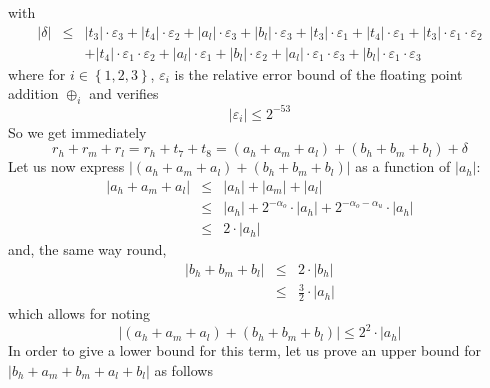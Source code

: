 \documentclass[a4paper,10pt,twoside]{article}
\newenvironment{proof}[1][Proof]{\begin{trivlist}
\item[\hskip \labelsep {\bfseries #1}]}{\end{trivlist}}
\newcommand{\hi}{\ensuremath{\mathit{h}}}
\newcommand{\mi}{\ensuremath{\mathit{m}}}
\newcommand{\lo}{\ensuremath{\mathit{l}}}
\renewcommand{\epsilon}{\varepsilon}
\begin{document}
\begin{proof}
with
\begin{eqnarray*}
\left \vert \delta \right \vert & \leq & \left \vert t_3 \right \vert \cdot \epsilon_3 + \left \vert t_4 \right \vert \cdot \epsilon_2 +
\left \vert a_\lo \right \vert \cdot \epsilon_3 + \left \vert b_\lo \right \vert \cdot \epsilon_3 + \left \vert t_3 \right \vert \cdot \epsilon_1
+ \left \vert t_4 \right \vert \cdot \epsilon_1 + \left \vert t_3 \right \vert \cdot \epsilon_1 \cdot \epsilon_2 \\
& & + \left \vert t_4 \right \vert \cdot \epsilon_1 \cdot \epsilon_2 + \left \vert a_\lo \right \vert \cdot \epsilon_1 +
\left \vert b_\lo \right \vert \cdot \epsilon_2 + \left \vert a_\lo \right \vert \cdot \epsilon_1 \cdot \epsilon_3 +
\left \vert b_\lo \right \vert \cdot \epsilon_1 \cdot \epsilon_3 
\end{eqnarray*}
where for $i\in\left\lbrace 1,2,3 \right\rbrace$, $\epsilon_i$ is the relative
error bound of the floating point addition $\oplus_i$ and verifies
$$\left \vert \epsilon_i \right \vert \leq 2^{-53}$$
So we get immediately 
$$r_\hi + r_\mi + r_\lo = r_\hi + t_7 + t_8 = \left( a_\hi + a_\mi + a_\lo \right) + \left( b_\hi + b_\mi + b_\lo \right) + \delta$$
Let us now express $\left \vert \left( a_\hi + a_\mi + a_\lo \right) + \left(
    b_\hi + b_\mi + b_\lo \right) \right \vert$ 
as a function of 
$\left \vert a_\hi \right \vert$: 
\begin{eqnarray*}
\left \vert a_\hi + a_\mi + a_\lo \right \vert & \leq & \left \vert a_\hi \right \vert + \left \vert a_\mi \right \vert + 
\left \vert a_\lo \right \vert \\
& \leq & \left \vert a_\hi \right \vert + 2^{-\alpha_o} \cdot \left \vert a_\hi \right \vert + 
2^{-\alpha_o-\alpha_u} \cdot \left \vert a_\hi \right \vert \\
& \leq & 2 \cdot \left \vert a_\hi \right \vert
\end{eqnarray*}
and, the same way round, 
\begin{eqnarray*}
\left \vert b_\hi + b_\mi + b_\lo \right \vert & \leq & 2 \cdot \left \vert b_\hi \right \vert \\
& \leq & \frac{3}{2} \cdot \left \vert a_\hi \right \vert
\end{eqnarray*}
which allows for noting
$$\left \vert \left( a_\hi + a_\mi + a_\lo \right) + \left( b_\hi + b_\mi + b_\lo \right) \right \vert \leq 2^2 \cdot \left \vert a_\hi \right \vert$$
In order to give a lower bound for this term, let us prove an upper bound for 
$\left \vert b_\hi + a_\mi + b_\mi + a_\lo + b_\lo \right \vert$ as follows

\end{proof}
\end{document}
